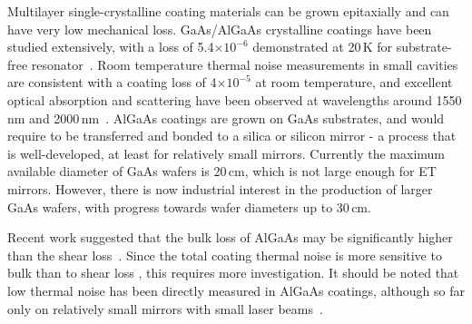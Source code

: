 Multilayer single-crystalline coating materials can be grown epitaxially and can have very low mechanical loss. GaAs/AlGaAs crystalline coatings have been studied extensively, with a loss of 5.4$\times10^{-6}$ demonstrated at 20\,K for substrate-free resonator~\cite{Cole_2012}. Room temperature thermal noise measurements in small cavities are consistent with a coating loss of 4$\times10^{-5}$ at room temperature, and excellent optical absorption and scattering have been observed at wavelengths around 1550\,nm and 2000\,nm~\cite{Cole_2016}. AlGaAs coatings are grown on GaAs substrates, and would require to be transferred and bonded to a silica or silicon mirror - a process that is well-developed, at least for relatively small mirrors.  Currently the maximum available diameter of GaAs wafers is 20\,cm, which is not large enough for ET mirrors. However, there is now industrial interest in the production of larger GaAs wafers,  with progress towards wafer diameters up to 30\,cm.

Recent work suggested that the bulk loss of AlGaAs may be significantly higher than the shear loss~\cite{Penn2019}. Since the total coating thermal noise is more sensitive to bulk than to shear loss , this requires more investigation. It should be noted that low thermal noise has been directly measured in AlGaAs coatings, although so far only on relatively small mirrors with small laser beams~\cite{Cole_2013}. 



